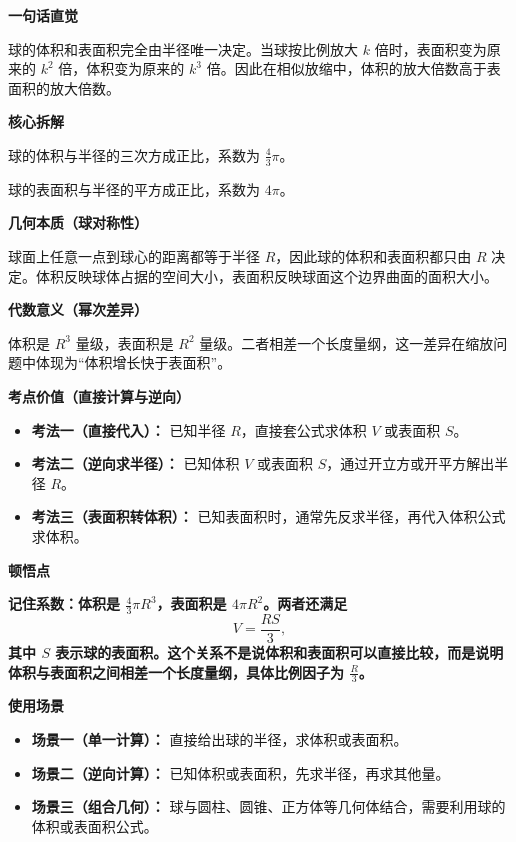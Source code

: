 \begin{explanationbox}
\textbf{\textcolor{CExplanation}{一句话直觉}}

球的体积和表面积完全由半径唯一决定。当球按比例放大 $k$ 倍时，表面积变为原来的 $k^2$ 倍，体积变为原来的 $k^3$ 倍。因此在相似放缩中，体积的放大倍数高于表面积的放大倍数。

\medskip
\textbf{\textcolor{CExplanation}{核心拆解}}
\begin{description}[style=nextline, leftmargin=2.8em, labelsep=0.5em, itemsep=0.45em]
\item[\textbf{要点一（立方关系）：}] 球的体积与半径的三次方成正比，系数为 $\frac{4}{3}\pi$。
\item[\textbf{要点二（平方关系）：}] 球的表面积与半径的平方成正比，系数为 $4\pi$。
\end{description}

\medskip
\textbf{\textcolor{CExplanation}{几何本质（球对称性）}}

球面上任意一点到球心的距离都等于半径 $R$，因此球的体积和表面积都只由 $R$ 决定。体积反映球体占据的空间大小，表面积反映球面这个边界曲面的面积大小。

\medskip
\textbf{\textcolor{CExplanation}{代数意义（幂次差异）}}

体积是 $R^{3}$ 量级，表面积是 $R^{2}$ 量级。二者相差一个长度量纲，这一差异在缩放问题中体现为“体积增长快于表面积”。

\medskip
\textbf{\textcolor{CExplanation}{考点价值（直接计算与逆向）}}
\begin{itemize}[leftmargin=*, itemsep=0.5em, topsep=0.4em]
\item \textbf{考法一（直接代入）：} 已知半径 $R$，直接套公式求体积 $V$ 或表面积 $S$。
\item \textbf{考法二（逆向求半径）：} 已知体积 $V$ 或表面积 $S$，通过开立方或开平方解出半径 $R$。
\item \textbf{考法三（表面积转体积）：} 已知表面积时，通常先反求半径，再代入体积公式求体积。
\end{itemize}

\medskip
\textbf{\textcolor{CExplanation}{顿悟点}}

\textbf{记住系数：体积是 $\frac{4}{3}\pi R^{3}$，表面积是 $4\pi R^{2}$。两者还满足}
\[
V = \frac{RS}{3},
\]
\textbf{其中 $S$ 表示球的表面积。这个关系不是说体积和表面积可以直接比较，而是说明体积与表面积之间相差一个长度量纲，具体比例因子为 $\frac{R}{3}$。}

\medskip
\textbf{\textcolor{CExplanation}{使用场景}}
\begin{itemize}[leftmargin=*, itemsep=0.5em, topsep=0.4em]
\item \textbf{场景一（单一计算）：} 直接给出球的半径，求体积或表面积。
\item \textbf{场景二（逆向计算）：} 已知体积或表面积，先求半径，再求其他量。
\item \textbf{场景三（组合几何）：} 球与圆柱、圆锥、正方体等几何体结合，需要利用球的体积或表面积公式。
\end{itemize}
\end{explanationbox}